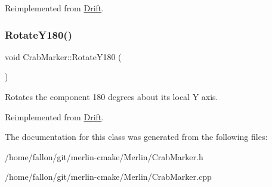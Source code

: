 Reimplemented from \hyperlink{classDrift_a9f3925549a0c7c99b39a1abea8546642}{Drift}.

\mbox{\label{classCrabMarker_a4b60620517f65b4e1f557300a3dbe89b}} 
\subsubsection{\texorpdfstring{Rotate\+Y180()}{RotateY180()}}
{\footnotesize\ttfamily void Crab\+Marker\+::\+Rotate\+Y180 (\begin{DoxyParamCaption}{ }\end{DoxyParamCaption})\hspace{0.3cm}{\ttfamily [virtual]}}

Rotates the component 180 degrees about its local Y axis. 

Reimplemented from \hyperlink{classDrift_abf387eddfcabfc81b186080f6301ce60}{Drift}.



The documentation for this class was generated from the following files\+:\begin{DoxyCompactItemize}
\item 
/home/fallon/git/merlin-\/cmake/\+Merlin/Crab\+Marker.\+h\item 
/home/fallon/git/merlin-\/cmake/\+Merlin/Crab\+Marker.\+cpp\end{DoxyCompactItemize}
